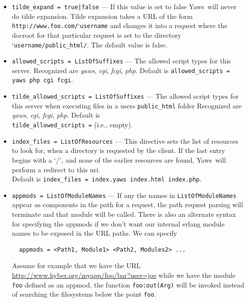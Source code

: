 \documentclass[11pt,oneside,english]{book}
\newcommand{\Yaws}            %
        {{\sc Yaws}}
\begin{document}
\begin{itemize}
\item       \verb+tilde_expand = true|false+ ---
              If  this  value  is  set  to false \Yaws\  will
              never do tilde  expansion.  Tilde expansion takes a URL
              of the form
              \verb+http://www.foo.com/+\char`\~\verb+username+ and
              changes it into a request where the docroot for that
              particular request is set to the directory
              \char`\~\verb+username/public_html/+. The default value
              is false.

\item       \verb+allowed_scripts = ListOfSuffixes+ ---
              The allowed script types for this server.  Recognized are
              \textit{yaws}, \textit{cgi}, \textit{fcgi}, \textit{php}.  Default
              is \verb+allowed_scripts = yaws php cgi fcgi+.

\item       \verb+tilde_allowed_scripts = ListOfSuffixes+ ---
             The allowed script types for this server when executing files in a
             users \verb+public_html+ folder Recognized are \textit{yaws},
             \textit{cgi}, \textit{fcgi}, \textit{php}. Default is\\
             \verb+tilde_allowed_scripts =+ (i.e., empty).

\item       \verb+index_files = ListOfResources+ ---
             This directive sets the list of resources to look for, when a
             directory is requested by the client. If the last entry begins with
             a `/', and none of the earlier resources are found, \Yaws\ will
             perform a redirect to this uri.\\
             Default is \verb+index_files = index.yaws index.html index.php+.

\item       \verb+appmods = ListOfModuleNames+ ---
             If any the names in \verb+ListOfModuleNames+ appear as components
             in the path for a request, the path request parsing will terminate
             and that module will be called. There is also an alternate syntax
             for specifying the appmods if we don't want our internal erlang
             module names to be exposed in the URL paths.  We can specify
\begin{verbatim}
  appmods = <Path1, Module1> <Path2, Modules2> ...
\end{verbatim}
             Assume for example that we have the URL
             \url{http://www.hyber.org/myapp/foo/bar?user=joe} while we
             have the module \verb+foo+ defined as an appmod, the function
             \verb+foo:out(Arg)+ will be invoked instead of searching the
             filesystems below the point \verb+foo+.


\end{itemize}
\end{document}
